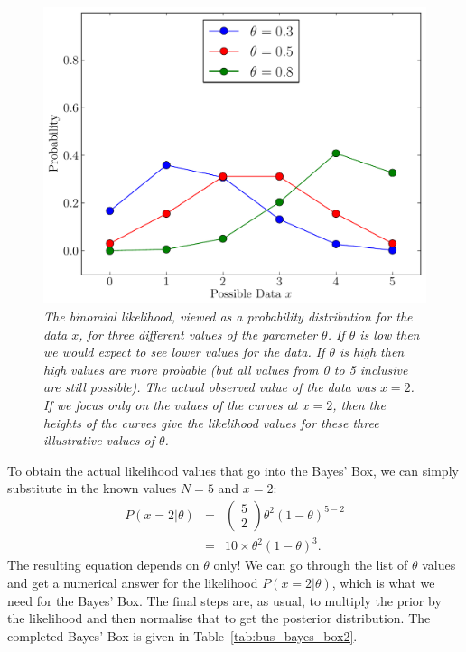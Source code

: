 \begin{figure}[h!]
\begin{center}
\includegraphics[scale=0.6]{Figures/binomial.pdf}
\caption{\it The binomial likelihood, viewed as a probability distribution for the
data $x$, for three different values of the parameter $\theta$. If $\theta$ is
low then we would expect to see lower values for the data. If $\theta$ is high
then high values are more probable (but all values from 0 to 5 inclusive are
still possible). The actual observed value of the data was $x=2$. If we focus
only on the values of the curves at $x=2$, then the heights of the curves give
the likelihood values for these three illustrative values of $\theta$.
\label{fig:binomial}}
\end{center}
\end{figure}
To obtain the actual likelihood values that go into the Bayes' Box, we can
simply substitute in the known values $N=5$ and $x=2$:
\begin{eqnarray}
P(x=2|\theta) &=& \left(\begin{array}{c}5 \\ 2\end{array}\right)
\theta^2\left(1-\theta\right)^{5 - 2}\\
&=& 10\times\theta^2\left(1-\theta\right)^3.\label{eq:binomial_likelihood3}
\end{eqnarray}
The resulting equation depends on $\theta$ only! We can go through the list of
$\theta$ values and get a numerical answer for the likelihood $P(x=2|\theta)$,
which is what we need for the Bayes' Box. The final steps are, as usual, to
multiply the prior by the likelihood and then normalise that to get the
posterior distribution. The completed Bayes' Box is given in
Table~\ref{tab:bus_bayes_box2}.

